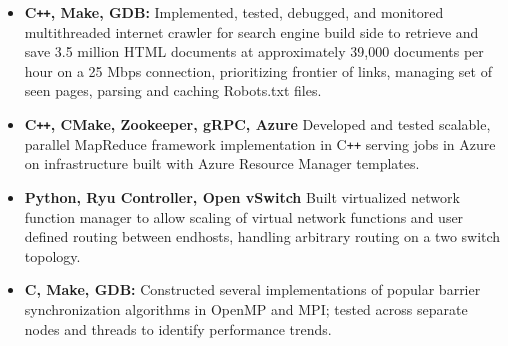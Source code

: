 \documentclass[overlapped]{res}
\begin{document}
\begin{resume}
\begin{itemize}[label={}]  \itemsep -2pt %
    \item \textbf{C\texttt{++}, Make, GDB:}
        Implemented, tested, debugged, and monitored multithreaded internet crawler
        for search engine build side to retrieve and save 3.5 million HTML documents
        at approximately 39,000 documents per hour on a 25 Mbps connection,
        prioritizing frontier of links, managing set of seen pages, parsing and caching Robots.txt files.
    \item \textbf{C\texttt{++}, CMake, Zookeeper, gRPC, Azure}
        Developed and tested scalable, parallel MapReduce framework implementation in C\texttt{++}
        serving jobs in Azure on infrastructure built with Azure Resource Manager templates.
    \item \textbf{Python, Ryu Controller, Open vSwitch}
        Built virtualized network function manager to allow scaling of virtual network functions and 
        user defined routing between endhosts, handling arbitrary routing on a two switch topology.
    \item \textbf{C, Make, GDB:}
        Constructed several implementations of popular barrier synchronization
        algorithms in OpenMP and MPI; tested across separate nodes and threads to identify
        performance trends.

\end{itemize}
\end{resume}
\end{document}
